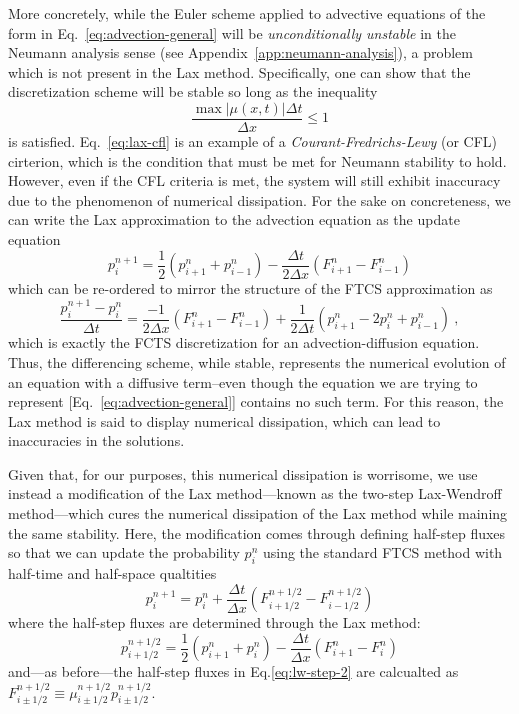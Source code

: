 \documentclass[15pt]{article}
\begin{document}
More concretely, while the Euler scheme applied to advective equations of the form in Eq.~\eqref{eq:advection-general} will be \emph{unconditionally unstable} in the Neumann analysis sense (see Appendix~\ref{app:neumann-analysis}), a problem which is not present in the Lax method. Specifically, one can show that the discretization scheme will be stable so long as the inequality
\begin{equation}
    \frac{\max|\mu(x, t)|\Delta t}{\Delta x} \leq 1 \label{eq:lax-cfl}
\end{equation}
is satisfied. Eq.~\eqref{eq:lax-cfl} is an example of a \emph{Courant-Fredrichs-Lewy} (or CFL) cirterion, which is the condition that must be met for Neumann stability to hold.  However, even if the CFL criteria is met, the system will still exhibit inaccuracy due to the phenomenon of numerical dissipation. For the sake on concreteness, we can write the Lax approximation to the advection equation as the update equation
\begin{equation}
    p_i^{n+1} = \frac{1}{2}\left( p_{i+1}^n + p_{i-1}^n \right) - \frac{\Delta t}{2\Delta x}\left( F_{i+1}^n - F_{i-1}^n \right) \label{eq:lax-explicity}
\end{equation}
which can be re-ordered to mirror the structure of the FTCS approximation as
\begin{equation}
    \frac{p_{i}^{n+1} - p_{i}^{n}}{\Delta t} = \frac{-1}{2\Delta x}\left( F_{i+1}^n - F_{i-1}^n \right) + \frac{1}{2\Delta t}\left( p_{i+1}^n - 2p_i^n + p_{i-1}^n  \right) \ ,
\end{equation}
which is exactly the FCTS discretization for an advection-diffusion equation. Thus, the differencing scheme, while stable, represents the numerical evolution of an equation with a diffusive term--even though the equation we are trying to represent [Eq.~\eqref{eq:advection-general}] contains no such term. For this reason, the Lax method is said to display numerical dissipation, which can lead to inaccuracies in the solutions.

Given that, for our purposes, this numerical dissipation is worrisome, we use instead a modification of the Lax method---known as the two-step Lax-Wendroff method---which cures the numerical dissipation of the Lax method while maining the same stability. Here, the modification comes through defining half-step fluxes so that we can update the probability $p_i^n$ using the standard FTCS method with half-time and half-space qualtities
\begin{equation}
    p_i^{n+1} = p_i^n + \frac{\Delta t}{\Delta x}\left( F_{i+1/2}^{n+1/2} - F_{i-1/2}^{n+1/2} \right) \label{eq:lw-step-2}
\end{equation}
where the half-step fluxes are determined through the Lax method:
\begin{equation}
    p_{i+1/2}^{n+1/2} = \frac{1}{2}\left( p_{i+1}^n + p_{i}^n \right) - \frac{\Delta t}{\Delta x}\left( F_{i+1}^n - F_i^n \right) \label{eq:lw-step-1}
\end{equation}
and---as before---the half-step fluxes in Eq.\eqref{eq:lw-step-2} are calcualted as $F_{i\pm1/2}^{n+1/2} \equiv \mu_{i\pm1/2}^{n+1/2}p_{i\pm1/2}^{n+1/2}$.
\end{document}
